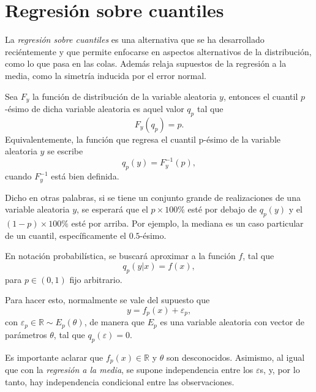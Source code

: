 \section{Regresión sobre cuantiles}

La \textit{regresi\'on sobre cuantiles} es una alternativa que se ha desarrollado reci\'entemente y que permite enfocarse en aspectos alternativos de la distribuci\'on, como lo que pasa en las colas. Adem\'as relaja supuestos de la regresi\'on a la media, como la simetr\'ia inducida por el error normal.

\begin{defin}
Sea $F_y$ la funci\'on de distribuci\'on de la variable aleatoria $y$, entonces el cuantil $p$-\'esimo de dicha variable aleatoria es aquel valor $q_p$ tal que
\begin{equation*}
    F_y(q_p) = p.
\end{equation*}
Equivalentemente, la funci\'on que regresa el cuantil p-\'esimo de la variable aleatoria $y$ se escribe
\begin{equation*}
    q_p(y) = F_y^{-1}(p),
\end{equation*}
cuando $F_y^{-1}$ est\'a bien definida.
\end{defin}
Dicho en otras palabras, si se tiene un conjunto grande de realizaciones de una variable aleatoria $y$, se esperar\'a que el $p \times 100\%$ est\'e por debajo de $q_p(y)$ y el $(1-p) \times 100\%$ est\'e por arriba. Por ejemplo, la mediana es un caso particular de un cuantil, espec\'ificamente el $0.5$-\'esimo. 

En notaci\'on probabil\'istica, se buscar\'a aproximar a la funci\'on $f$, tal que 
\begin{equation*}
    q_p(y|x) = f(x),
\end{equation*}
para $p \in (0,1)$ fijo arbitrario.

Para hacer esto, normalmente se vale del supuesto que
\begin{equation*}
    y = f_p(x) + \varepsilon_p,
\end{equation*}
con $\varepsilon_p \in \mathbb{R} \sim E_p(\theta)$, de manera que $E_p$ es una variable aleatoria con vector de par\'ametros $\theta$, tal que $q_p(\varepsilon) = 0$. 

Es importante aclarar que $f_p(x) \in \mathbb{R}$ y $\theta$ son desconocidos. Asimismo, al igual que con la \textit{regresi\'on a la media}, se supone independencia entre los $\varepsilon$s, y, por lo tanto, hay independencia condicional entre las observaciones.

